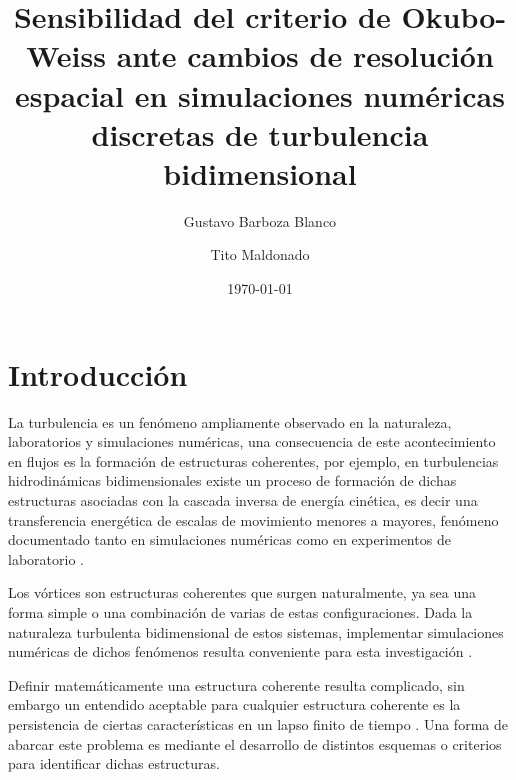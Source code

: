 \title			{Sensibilidad del criterio de Okubo-Weiss 
				ante cambios de resolución espacial en simulaciones 
				numéricas discretas de turbulencia bidimensional}
\author         {Gustavo Barboza Blanco} %
\author         {Tito Maldonado}%
\date{\today} %

\begin{abstract}
\end{abstract}

\maketitle

\section{Introducción}

La turbulencia es un fenómeno ampliamente observado en la naturaleza, laboratorios y simulaciones numéricas, 
una consecuencia de este acontecimiento en flujos es la formación de estructuras coherentes,
por ejemplo, en turbulencias hidrodinámicas bidimensionales existe un proceso de 
formación de dichas estructuras asociadas con la cascada inversa de energía cinética,
es decir una transferencia energética de escalas de movimiento menores a mayores, fenómeno documentado 
tanto en simulaciones numéricas como en experimentos de laboratorio 
\cite{boffetta2010,wang2023,chen2006,xiao2009,benzi1986}.

Los vórtices son estructuras coherentes que surgen naturalmente, ya sea una forma simple
o una combinación de varias de estas configuraciones. Dada la naturaleza turbulenta 
bidimensional de estos sistemas, implementar simulaciones numéricas de dichos fenómenos
resulta conveniente para esta investigación \cite{wang2023}. 

Definir matemáticamente una estructura coherente resulta complicado, sin embargo un entendido 
aceptable para cualquier estructura coherente es la persistencia de ciertas características en un lapso finito de 
tiempo \cite{chakraborty2005}. Una forma de abarcar este problema es mediante el desarrollo de distintos esquemas
o criterios para identificar dichas estructuras.

